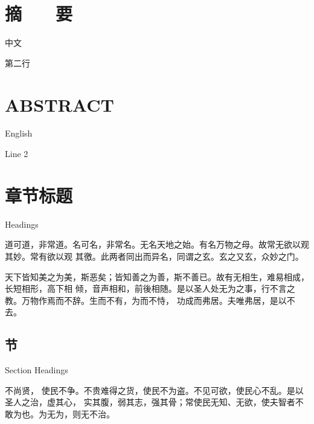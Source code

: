 \documentclass[a4paper, twoside, openany, extrafontsizes]{dlutthesis}
\begin{document}
\maketitle

\cleardoublepage
\makedeclaration

\frontmatter

\cleardoublepage
\chapter*{摘　　要}

中文

第二行


\cleardoublepage
\chapter*{ABSTRACT}

English

Line 2


\cleardoublepage
\tableofcontents*

\cleardoublepage
\tableofencontents*

\cleardoublepage
\listoffigures*

\vspace{5.2em}
\listoftables*

\mainmatter

\chapter{章节标题}{Headings}

道可道，非常道。名可名，非常名。无名天地之始。有名万物之母。故常无欲以观其妙。常有欲以观
其徼。此两者同出而异名，同谓之玄。玄之又玄，众妙之门。

天下皆知美之为美，斯恶矣；皆知善之为善，斯不善已。故有无相生，难易相成，长短相形，高下相
倾，音声相和，前後相随。是以圣人处无为之事，行不言之教。万物作焉而不辞。生而不有，为而不恃，
功成而弗居。夫唯弗居，是以不去。

\section{节}{Section Headings}
\label{sec:section}


不尚贤， 使民不争。不贵难得之货，使民不为盗。不见可欲，使民心不乱。是以圣人之治，虚其心，
实其腹，弱其志，强其骨；常使民无知、无欲，使夫智者不敢为也。为无为，则无不治。
\end{document}
